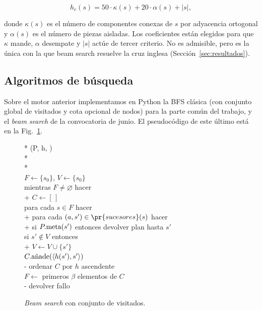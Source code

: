 \documentclass[conference,a4paper]{IEEEtran}
\begin{document}
\begin{equation}
\label{eq:conectividad}
h_c(s) = 50 \cdot \kappa(s) + 20 \cdot \alpha(s) + |s|,
\end{equation}

donde $\kappa(s)$ es el número de componentes conexas de $s$ por
adyacencia ortogonal y $\alpha(s)$ es el número de piezas aisladas. Los
coeficientes están elegidos para que $\kappa$ mande, $\alpha$ desempate
y $|s|$ actúe de tercer criterio. No es admisible, pero es la única con
la que beam search resuelve la cruz inglesa
(Sección~\ref{sec:resultados}).


\subsection{Algoritmos de búsqueda}

Sobre el motor anterior implementamos en Python la BFS clásica (con
conjunto global de visitados y cota opcional de nodos) para la parte
común del trabajo, y el \emph{beam search} de la convocatoria de junio.
El pseudocódigo de este último está en la Fig.~\ref{pcd:beam}.

\begin{figure}[!htbp]
\begin{pseudo}*
  (P, h, \beta) \\*
   \\*
   \\
  $F \leftarrow \{s_{0}\}$, $V \leftarrow \{s_{0}\}$ \\
  mientras $F \neq \varnothing$ hacer \\+
    $C \leftarrow [\,]$ \\
    para cada $s \in F$ hacer \\+
      para cada $(a, s') \in \pr{sucesores}(s)$ hacer \\+
        si $P.\textnormal{meta}(s')$ entonces devolver plan hasta $s'$ \\
        si $s' \notin V$ entonces \\+
          $V \leftarrow V \cup \{s'\}$ \\
          $C.\textnormal{añade}(\langle h(s'), s' \rangle)$ \\-\-\-
    ordenar $C$ por $h$ ascendente \\
    $F \leftarrow$ primeros $\beta$ elementos de $C$ \\-
  devolver fallo
\end{pseudo}
\caption{\emph{Beam search} con conjunto de visitados.}
\label{pcd:beam}
\end{figure}
\end{document}
